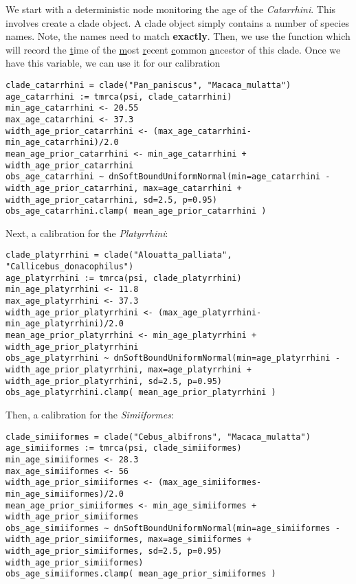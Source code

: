 We start with a deterministic node monitoring the age of the \emph{Catarrhini}.
This involves create a clade object.
A clade object simply contains a number of species names.
Note, the names need to match \textbf{exactly}.
Then, we use the  function which will record the \underline{t}ime of the \underline{m}ost \underline{r}ecent \underline{c}ommon \underline{a}ncestor of this clade.
Once we have this variable, we can use it for our calibration
{\tt \begin{snugshade*}
\begin{lstlisting}
clade_catarrhini = clade("Pan_paniscus", "Macaca_mulatta")
age_catarrhini := tmrca(psi, clade_catarrhini)
min_age_catarrhini <- 20.55
max_age_catarrhini <- 37.3
width_age_prior_catarrhini <- (max_age_catarrhini-min_age_catarrhini)/2.0
mean_age_prior_catarrhini <- min_age_catarrhini + width_age_prior_catarrhini
obs_age_catarrhini ~ dnSoftBoundUniformNormal(min=age_catarrhini - width_age_prior_catarrhini, max=age_catarrhini + width_age_prior_catarrhini, sd=2.5, p=0.95)
obs_age_catarrhini.clamp( mean_age_prior_catarrhini )
\end{lstlisting}
\end{snugshade*}}

Next, a calibration for the \emph{Platyrrhini}:
{\tt \begin{snugshade*}
\begin{lstlisting}
clade_platyrrhini = clade("Alouatta_palliata", "Callicebus_donacophilus")
age_platyrrhini := tmrca(psi, clade_platyrrhini)
min_age_platyrrhini <- 11.8
max_age_platyrrhini <- 37.3
width_age_prior_platyrrhini <- (max_age_platyrrhini-min_age_platyrrhini)/2.0
mean_age_prior_platyrrhini <- min_age_platyrrhini + width_age_prior_platyrrhini
obs_age_platyrrhini ~ dnSoftBoundUniformNormal(min=age_platyrrhini - width_age_prior_platyrrhini, max=age_platyrrhini + width_age_prior_platyrrhini, sd=2.5, p=0.95)
obs_age_platyrrhini.clamp( mean_age_prior_platyrrhini )
\end{lstlisting}
\end{snugshade*}}

Then, a calibration for the \emph{Simiiformes}:
{\tt \begin{snugshade*}
\begin{lstlisting}
clade_simiiformes = clade("Cebus_albifrons", "Macaca_mulatta")
age_simiiformes := tmrca(psi, clade_simiiformes)
min_age_simiiformes <- 28.3
max_age_simiiformes <- 56
width_age_prior_simiiformes <- (max_age_simiiformes-min_age_simiiformes)/2.0
mean_age_prior_simiiformes <- min_age_simiiformes + width_age_prior_simiiformes
obs_age_simiiformes ~ dnSoftBoundUniformNormal(min=age_simiiformes - width_age_prior_simiiformes, max=age_simiiformes + width_age_prior_simiiformes, sd=2.5, p=0.95)
width_age_prior_simiiformes)
obs_age_simiiformes.clamp( mean_age_prior_simiiformes )
\end{lstlisting}
\end{snugshade*}}

